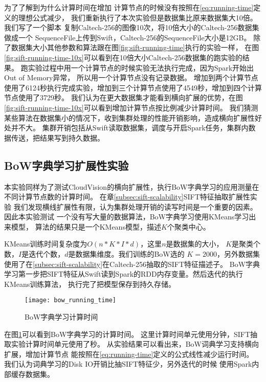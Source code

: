 为了了解到为什么计算时间在增加
计算节点的时候没有按照在\ref{eq:running-time}定义的理想公式减少，
我们重新执行了本次实验但是数据集比原来数据集大10倍。我们写了一个脚本
复制Caltech-256的图像10次，将10倍大小的Caltech-256数据集做成一个
SequenceFile上传到Swift，Caltech-256的SequenceFile大小是12GB。
除了数据集大小其他参数和算法跟在图\ref{fig:sift-running-time}执行的实验一样，
在图\ref{fig:sift-running-time-10x}可以看到在10倍大小Caltech-256数据集的跑实验的结果。
跑实验过程中用一个计算节点的时候实验无法执行完成，因为Spark开始出Out of Memory异常，
所以用一个计算节点没有记录数据。
增加到两个计算节点使用了6124秒执行完成实验，增加到三个计算节点使用了4549秒，增加到四个计算节点使用了3729秒。
我们认为在更大数据集才能看到横向扩展的优势，在图\ref{fig:sift-running-time-10x}可以看到增加计算节点按比例减少计算时间。
我们猜测某些算法在数据集小的情况下，收到集群处理的性能开销影响，造成横向扩展性好处并不大。
集群开销包括从Swift读取数据集，调度与开启Spark任务，集群内数据传送，把结果写到持久数据。




\subsection{BoW字典学习扩展性实验}
\label{subsec:bow-learning-scalability}
本实验同样为了测试CloudVision的横向扩展性，执行BoW字典学习的应用测量在不同计算节点数的计算时间。
在章\ref{subsec:sift-scalability}SIFT特征抽取扩展性实验
我们发现横线扩展性有限，认为集群处理开销的读写时间是一个重要的因素。因此本实验测试
一个没有写大量的数据算法，BoW字典学习使用KMeans学习出来模型，
算法的结果只是一个KMeans模型，描述$K$个聚类中心。

KMeans训练时间复杂度为$O(n * K * I *d)$，这里$n$是数据集的大小，
$K$是聚类个数，$I$是迭代个数，$d$是数据集维度。我们训练的BoW选的
$K = 2000$，另外数据集使用了在\ref{subsec:sift-scalability}在Caltech-256抽取的SIFT特征描述子。
BoW字典学习第一步把SIFT特征从Swift读到Spark的RDD内存变量。然后迭代的执行KMeans训练算法，
执行完了把模型保存到持久存储。

\begin{figure}[h]
  \centering
    \texttt{[image: bow\_running\_time]}
  \caption{BoW字典学习计算时间}
  \label{fig:bow-running-time}
\end{figure}

在图\ref{fig:bow-running-time}可以看到BoW字典学习的计算时间。
这里计算时间单元使用分钟，SIFT抽取实验计算时间单元使用了秒。
从实验结果可以看出来，BoW词典学习支持横向扩展，增加计算节点
能按照在\ref{eq:running-time}定义的公式线性减少运行时间。
我们认为词典学习的Disk IO开销比抽SIFT特征少，另外迭代的时候
使用Spark内部缓存数据集。

